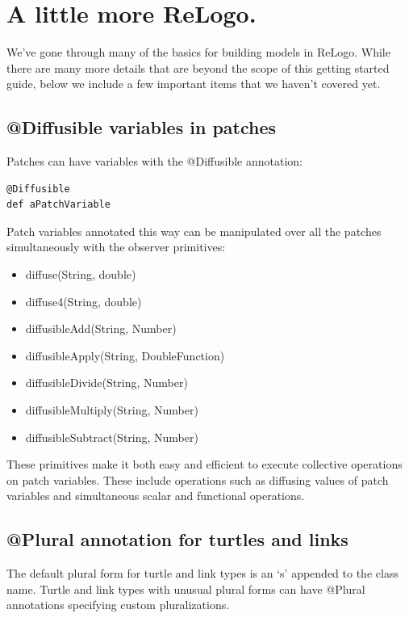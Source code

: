 \documentclass[11pt]{amsart}
\begin{document}
\clearpage

\section{A little more ReLogo.}
We've gone through many of the basics for building models in ReLogo. While there are many more details that are beyond the scope of this getting started guide, below we include a few important items that we haven't covered yet.

\subsection{@Diffusible variables in patches}
Patches can have variables with the @Diffusible annotation:

\noindent\begin{minipage}[h]{\textwidth}
\vspace{.2in}
\lstset{language=java, numbers=none}
\begin{lstlisting}
@Diffusible
def aPatchVariable
\end{lstlisting}
\vspace{.2in}
\end{minipage}

Patch variables annotated this way can be manipulated over all the patches simultaneously with the observer primitives:
\begin{itemize}
\item diffuse(String, double)
\item diffuse4(String, double)
\item diffusibleAdd(String, Number)
\item diffusibleApply(String, DoubleFunction)
\item diffusibleDivide(String, Number)
\item diffusibleMultiply(String, Number)
\item diffusibleSubtract(String, Number)
\end{itemize}
These primitives make it both easy and efficient to execute collective operations on patch variables. These include operations such as diffusing values of patch variables and simultaneous scalar and functional operations.

\subsection{@Plural annotation for turtles and links}
The default plural form for turtle and link types is an `s' appended to the class name. Turtle and link types with unusual plural forms can have @Plural annotations specifying custom pluralizations.
\end{document}
